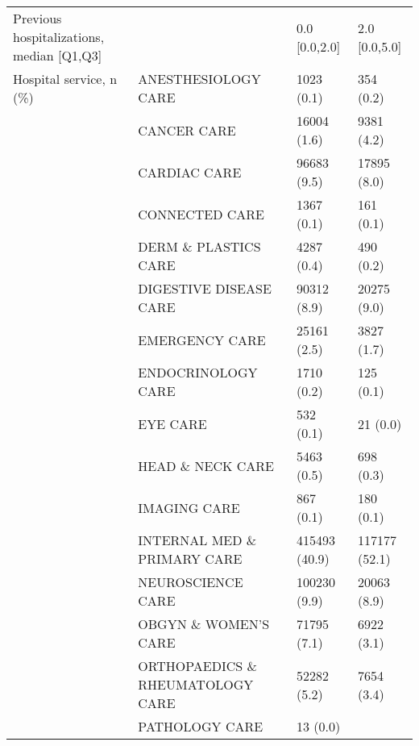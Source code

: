 \begin{tabular}{llll}
Previous hospitalizations, median [Q1,Q3] &   &                  0.0 [0.0,2.0] &     2.0 [0.0,5.0] \\
Hospital service, n (\%) & ANESTHESIOLOGY CARE &                     1023 (0.1) &         354 (0.2) \\
                                       & CANCER CARE &                    16004 (1.6) &        9381 (4.2) \\
                                       & CARDIAC CARE &                    96683 (9.5) &       17895 (8.0) \\
                                       & CONNECTED CARE &                     1367 (0.1) &         161 (0.1) \\
                                       & DERM \& PLASTICS CARE &                     4287 (0.4) &         490 (0.2) \\
                                       & DIGESTIVE DISEASE CARE &                    90312 (8.9) &       20275 (9.0) \\
                                       & EMERGENCY CARE &                    25161 (2.5) &        3827 (1.7) \\
                                       & ENDOCRINOLOGY CARE &                     1710 (0.2) &         125 (0.1) \\
                                       & EYE CARE &                      532 (0.1) &          21 (0.0) \\
                                       & HEAD \& NECK CARE &                     5463 (0.5) &         698 (0.3) \\
                                       & IMAGING CARE &                      867 (0.1) &         180 (0.1) \\
                                       & INTERNAL MED \& PRIMARY CARE &                  415493 (40.9) &     117177 (52.1) \\
                                       & NEUROSCIENCE CARE &                   100230 (9.9) &       20063 (8.9) \\
                                       & OBGYN \& WOMEN'S CARE &                    71795 (7.1) &        6922 (3.1) \\
                                       & ORTHOPAEDICS \& RHEUMATOLOGY CARE &                    52282 (5.2) &        7654 (3.4) \\
                                       & PATHOLOGY CARE &                       13 (0.0) &                   \\

\end{tabular}
